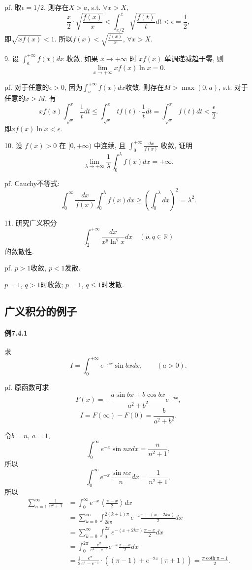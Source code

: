pf. 取$\epsilon=1/2$, 则存在$X>a$, s.t. $\forall x>X$, 
\[
\frac{x}{2}\cdot\sqrt{\frac{f(x)}{x}}<\int_{x/2}^{x}\sqrt{\frac{f(t)}{t}}dt<\epsilon=\frac{1}{2},
\]
即$\sqrt{xf(x)}<1$. 所以$f(x)<\sqrt{\frac{f(x)}{x}}$, $\forall x>X$.

9. 设 $\int_{a}^{+\infty}f(x)dx$ 收敛, 如果 $x\rightarrow+\infty$ 时 $xf(x)$
单调递减趋于零, 则 
\[
\lim_{x\rightarrow+\infty}xf(x)\ln x=0.
\]

pf. 对于任意的$\epsilon>0$, 因为$\int_{a}^{+\infty}f(x)dx$收敛, 则存在$M>\max(0,a)$,
s.t. 对于任意的$x>M$, 有
\[
xf(x)\int_{\sqrt{x}}^{x}\frac{1}{t}dt\le\int_{\sqrt{x}}^{x}tf(t)\cdot\frac{1}{t}dt=\int_{\sqrt{x}}^{x}f(t)dt<\frac{\epsilon}{2}.
\]
即$xf(x)\ln x<\epsilon$.

10. 设 $f(x)>0$ 在 $[0,+\infty)$ 中连续, 且 $\int_{0}^{+\infty}\frac{dx}{f(x)}$
收敛, 证明 
\[
\lim_{\lambda\rightarrow+\infty}\frac{1}{\lambda}\int_{0}^{\lambda}f(x)dx=+\infty.
\]

pf. Cauchy不等式:
\[
\int_{0}^{\infty}\frac{dx}{f(x)}\int_{0}^{\lambda}f(x)dx\ge\left(\int_{0}^{\lambda}dx\right)^{2}=\lambda^{2}.
\]

11. 研究广义积分 
\[
\int_{2}^{+\infty}\frac{dx}{x^{p}\ln^{q}x}dx\quad(p,q\in\mathbb{R})
\]
的敛散性.

pf. $p>1$收敛, $p<1$发散.

$p=1$, $q>1$时收敛; $p=1$, $q\le1$时发散.

\subsection{广义积分的例子}

\paragraph{例7.4.1}

求
\[
I=\int_{0}^{+\infty}e^{-ax}\sin bxdx,\qquad(a>0).
\]

pf. 原函数可求
\[
F(x)=-\frac{a\sin bx+b\cos bx}{a^{2}+b^{2}}e^{-ax},
\]
\[
I=F(\infty)-F(0)=\frac{b}{a^{2}+b^{2}}.
\]

令$b=n$, $a=1$, 
\[
\int_{0}^{\infty}e^{-x}\sin nxdx=\frac{n}{n^{2}+1},
\]
所以
\[
\int_{0}^{\infty}e^{-x}\frac{\sin nx}{n}dx=\frac{1}{n^{2}+1},
\]
所以
\begin{align*}
	\sum_{n=1}^{\infty}\frac{1}{n^{2}+1} & =\int_{0}^{\infty}e^{-x}\left\langle \frac{\pi-x}{2}\right\rangle dx\\
	& =\sum_{k=0}^{\infty}\int_{2k\pi}^{2(k+1)\pi}e^{-x}\frac{\pi-(x-2k\pi)}{2}dx\\
	& =\sum_{k=0}^{\infty}\int_{0}^{2\pi}e^{-(x+2k\pi)}\frac{\pi-x}{2}dx\\
	& =\int_{0}^{2\pi}\frac{e^{\pi}}{e^{\pi}-e^{-\pi}}e^{-x}\frac{\pi-x}{2}dx\\
	& =\frac{1}{2}\frac{e^{\pi}}{e^{\pi}-e^{-\pi}}\cdot\left((\pi-1)+e^{-2\pi}(\pi+1)\right)=\frac{\pi\coth\pi-1}{2}.
\end{align*}


